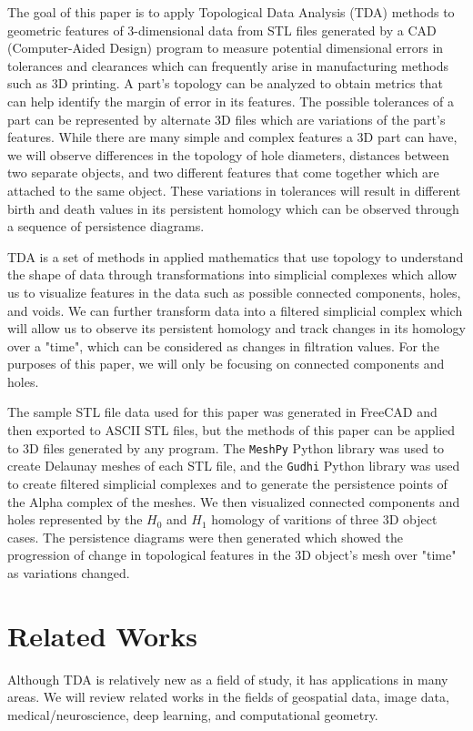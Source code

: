 \documentclass[ma]{uncgdissertationexp}
\theoremstyle{plain}
\theoremstyle{definition}
\theoremstyle{remark}
\begin{document}
\par The goal of this paper is to apply Topological Data Analysis (TDA) methods to geometric features of 3-dimensional data from STL files generated by a CAD (Computer-Aided Design) program to measure potential dimensional errors in tolerances and clearances which can frequently arise in manufacturing methods such as 3D printing. A part's topology can be analyzed to obtain metrics that can help identify the margin of error in its features. The possible tolerances of a part can be represented by alternate 3D files which are variations of the part's features. While there are many simple and complex features a 3D part can have, we will observe differences in the topology of hole diameters, distances between two separate objects, and two different features that come together which are attached to the same object. These variations in tolerances will result in different birth and death values in its persistent homology which can be observed through a sequence of persistence diagrams.
\par TDA is a set of methods in applied mathematics that use topology to understand the shape of data through transformations into simplicial complexes which allow us to visualize features in the data such as possible connected components, holes, and voids. We can further transform data into a filtered simplicial complex which will allow us to observe its persistent homology and track changes in its homology over a "time", which can be considered as changes in filtration values. For the purposes of this paper, we will only be focusing on connected components and holes. 
\par The sample STL file data used for this paper was generated in FreeCAD and then exported to ASCII STL files, but the methods of this paper can be applied to 3D files generated by any program. The \verb"MeshPy" Python library was used to create Delaunay meshes of each STL file, and the \verb"Gudhi" Python library was used to create filtered simplicial complexes and to generate the persistence points of the Alpha complex of the meshes. We then visualized connected components and holes represented by the $H_0$ and $H_1$ homology of varitions of three 3D object cases. The persistence diagrams were then generated which showed the progression of change in topological features in the 3D object's mesh over "time" as variations changed.
\section{Related Works}
\par Although TDA is relatively new as a field of study, it has applications in many areas. We will review related works in the fields of geospatial data, image data, medical/neuroscience, deep learning, and computational geometry.
\end{document}
